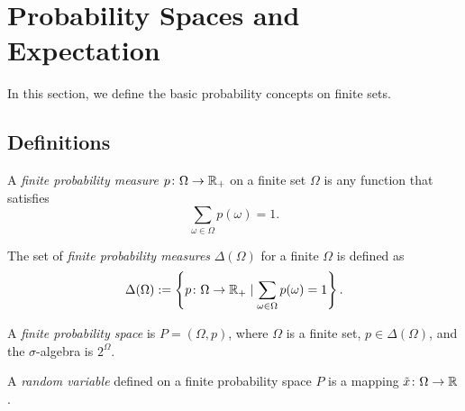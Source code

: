 %

\section{Probability Spaces and Expectation}

In this section, we define the basic probability concepts on finite sets.

\subsection{Definitions}

\begin{definition} \label{def:probability-measure}
A \emph{finite probability measure} $p\colon \Omega \to \mathbb{R}_+$ on a finite set $\Omega$ is any function that satisfies
\[
\sum_{\omega \in \Omega } p(\omega) = 1. 
\]
 \leanok
\end{definition}

\begin{definition}
The set of \emph{finite probability measures} $\Delta(\Omega)$ for a finite $\Omega$ is defined as
\[
\Delta(\Omega) := \left\{ p\colon \Omega \to \mathbb{R}_+ \mid  \sum_{\omega \in \Omega } p(\omega) = 1 \right\}.
\]
 \leanok
\end{definition}

\begin{definition} \label{def:probability-space}
A \emph{finite probability space} is $P = (\Omega, p)$, where $\Omega$ is a finite set, $p\in \Delta(\Omega)$, and the $\sigma$-algebra is $2^{\Omega}$.
 \leanok
\end{definition}

\begin{definition}
A \emph{random variable} defined on a finite probability space $P$ is a mapping $\tilde{x}\colon \Omega \to \mathbb{R}$.
 \leanok
\end{definition}


